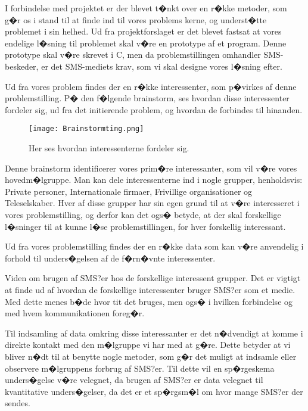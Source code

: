 I forbindelse med projektet er der blevet t�nkt over en r�kke metoder, som g�r os i stand til at finde ind til vores problems kerne, og underst�tte problemet i sin helhed.
Ud fra projektforslaget er det blevet fastsat at vores endelige l�sning til problemet skal v�re en prototype af et program. Denne prototype skal v�re skrevet i C, men da problemstillingen omhandler SMS-beskeder, er det  SMS-mediets krav, som vi skal designe vores l�sning efter.


Ud fra vores problem findes der en r�kke interessenter, som p�virkes af denne problemstilling.
P� den f�lgende brainstorm, ses hvordan disse interessenter fordeler sig, ud fra det initierende problem, og hvordan de forbindes til hinanden.

\begin{figure}[H]
\texttt{[image: Brainstormting.png]}
\caption{Her ses hvordan interessenterne fordeler sig.}
\end{figure}

Denne brainstorm identificerer vores prim�re interessanter, som vil v�re vores hovedm�lgruppe.
Man kan dele interessenterne ind i nogle grupper, henholdsvis: Private personer, Internationale firmaer, Frivillige organisationer og Teleselskaber.
Hver af disse grupper har sin egen grund til at v�re interesseret i vores problemstilling, og derfor kan det ogs� betyde, at der skal forskellige l�sninger til at kunne l�se problemstillingen, for hver forskellig interessant.


Ud fra vores problemstilling findes der en r�kke data som kan v�re anvendelig i forhold til unders�gelsen af de f�rn�vnte interessenter.


Viden om brugen af SMS?er hos de forskellige interessent grupper.
Det er vigtigt at finde ud af hvordan de forskellige interessenter bruger SMS?er som et medie. Med dette menes b�de hvor tit det bruges, men ogs� i hvilken forbindelse og med hvem kommunikationen foreg�r.


Til indsamling af data omkring disse interessanter er det n�dvendigt at komme i direkte kontakt med den m�lgruppe vi har med at g�re. Dette betyder at vi bliver n�dt til at benytte nogle metoder, som g�r det muligt at indsamle eller observere m�lgruppens forbrug af SMS?er.
Til dette vil en sp�rgeskema unders�gelse v�re velegnet, da brugen af SMS?er er data velegnet til kvantitative unders�gelser, da det er et sp�rgsm�l om hvor mange SMS?er der sendes.